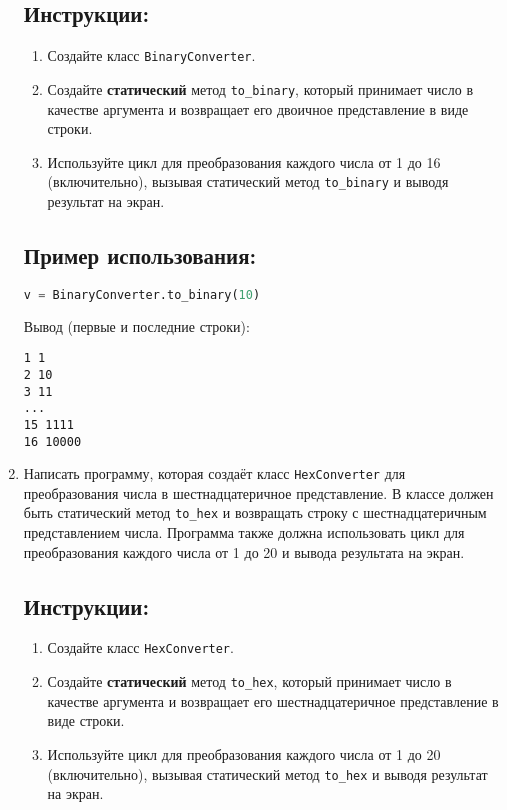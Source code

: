 \begin{enumerate}
\subsection*{Инструкции:}
\begin{enumerate}
    \item Создайте класс \texttt{BinaryConverter}.
    \item Создайте \textbf{статический} метод \texttt{to\_binary}, который принимает число в качестве аргумента и возвращает его двоичное представление в виде строки.
    \item Используйте цикл для преобразования каждого числа от 1 до 16 (включительно), вызывая статический метод \texttt{to\_binary} и выводя результат на экран.
\end{enumerate}

\subsection*{Пример использования:}
\begin{lstlisting}[language=Python]
    v = BinaryConverter.to_binary(10)
\end{lstlisting}
Вывод (первые и последние строки):
\begin{verbatim}
1 1
2 10
3 11
...
15 1111
16 10000
\end{verbatim}

\item
Написать программу, которая создаёт класс \texttt{HexConverter} 
для преобразования числа в шестнадцатеричное представление. В классе должен быть статический метод
\texttt{to\_hex} и возвращать строку с шестнадцатеричным представлением числа. 
Программа также должна использовать цикл для преобразования каждого числа от 
1 до 20 и вывода результата на экран.

\subsection*{Инструкции:}
\begin{enumerate}
    \item Создайте класс \texttt{HexConverter}.
    \item Создайте \textbf{статический} метод \texttt{to\_hex}, который принимает число в качестве аргумента и возвращает его шестнадцатеричное представление в виде строки.
    \item Используйте цикл для преобразования каждого числа от 1 до 20 (включительно), вызывая статический метод \texttt{to\_hex} и выводя результат на экран.
\end{enumerate}


\end{enumerate}
